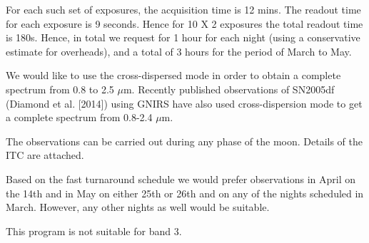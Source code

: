 \documentclass[11pt]{article}
\begin{document}
For each such set of  exposures, the acquisition time is 12 mins. The readout time for each exposure is 9 seconds. Hence for 10 X 2 exposures the total readout time is 180s. 
Hence, in total we request for 1 hour for each night (using a conservative estimate for overheads), and a total of 3 hours for the period of March to May. 

We would like to use the cross-dispersed mode in order to obtain a complete spectrum from 0.8 to 2.5 $\mu$m. Recently published observations of SN2005df (Diamond et al. [2014]) using GNIRS have also used cross-dispersion mode to get a complete spectrum from 0.8-2.4 $\mu$m.

The observations can be carried out during any phase of the moon. Details of the ITC are attached. 

Based on the fast turnaround schedule we would prefer observations in April on the 14th and in May on either 25th or 26th and on any of the nights scheduled in March. However, any other nights as well would be suitable. 
\bigskip



\bandthreeplan    %

This program is not suitable for band 3.

\bigskip


\end{document}
